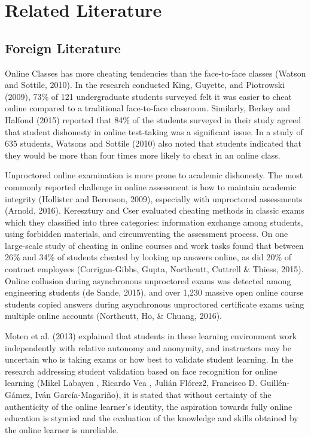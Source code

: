 \chapter{Related Literature}

\section{Foreign Literature}

Online Classes has more cheating tendencies than the face-to-face classes (Watson and Sottile, 2010).
In the research conducted King, Guyette, and Piotrowski (2009), 73\% of 121 undergraduate students surveyed felt it was easier to cheat online compared to a traditional face-to-face classroom.
Similarly, Berkey and Halfond (2015) reported that 84\% of the students surveyed in their study agreed that student dishonesty in online test-taking was a significant issue.
In a study of 635 students, Watsons and Sottile (2010) also noted that students indicated that they would be more than four times more likely to cheat in an online class.

Unproctored online examination is more prone to academic dishonesty.
The most commonly reported challenge in online assessment is how to maintain academic integrity (Hollister and Berenson, 2009), especially with unproctored assessments (Arnold, 2016).
Keresztury and Cser evaluated cheating methods in classic exams which they classified into three categories: information exchange among students, using forbidden materials, and circumventing the assessment process.
On one large-scale study of cheating in online courses and work tasks found that between 26\% and 34\% of students cheated by looking up answers online, as did 20\% of contract employees (Corrigan-Gibbs, Gupta, Northcutt, Cuttrell \& Thiess, 2015).
Online collusion during asynchronous unproctored exams was detected among engineering students (de Sande, 2015), and over 1,230 massive open online course students copied answers during asynchronous unproctored certificate exams using multiple online accounts (Northcutt, Ho, \& Chuang, 2016).

Moten et al. (2013) explained that students in these learning environment work independently with relative autonomy and anonymity, and instructors may be uncertain who is taking exams or how best to validate student learning.
In the research addressing student validation based on face recognition for online learning (Mikel Labayen , Ricardo Vea , Julián Flórez2, Francisco D. Guillén-Gámez, Iván García-Magariño), it is stated that without certainty of the authenticity of the online learner’s identity, the aspiration towards fully online education is stymied and the evaluation of the knowledge and skills obtained by the online learner is unreliable.


